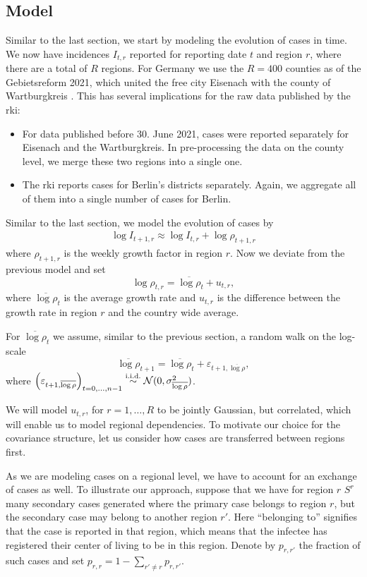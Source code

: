 \subsection{Model}
Similar to the last section, we start by modeling the evolution of cases in time. We now have incidences $I_{t,r}$ reported for reporting date $t$ and region $r$, where there are a total of $R$ regions. For Germany we use the $R=400$ counties as of the Gebietsreform 2021, which united the free city Eisenach with the county of Wartburgkreis \citep{FreistaatThueringen2019Thueringer}. This has several implications for the raw data published by the \gls{rki}:
\begin{itemize}
    \item For data published before 30. June 2021, cases were reported separately for Eisenach and the Wartburgkreis. In pre-processing the data on the county level, we merge these two regions into a single one.
    \item The \gls{rki} reports cases for Berlin's districts separately. Again, we aggregate all of them into a single number of cases for Berlin. 
\end{itemize}

Similar to the last section, we model the evolution of cases by 
\begin{align}
    \label{eq:log-growth-regional-model}
    \log I_{t + 1, r} \approx \log I_{t, r} + \log \rho_{t + 1, r}
\end{align}
where $\rho_{t+1, r}$ is the weekly growth factor in region $r$. Now we deviate from the previous model and set
$$
    \log \rho_{t, r} = \overline{\log \rho}_{t} + u_{t, r},
$$
where $\overline{\log\rho}_{t}$ is the average growth rate and $u_{t,r}$ is the difference between the growth rate in region $r$ and the country wide average. 

For $\overline{\log \rho}_{t}$ we assume, similar to the previous section, a random walk on the log-scale
$$
    \overline{\log\rho}_{t +1} = \overline{\log\rho}_{t} + \varepsilon_{t+1, \overline{\log \rho}},
$$
where $\left(\varepsilon_{t + 1, \overline{\log\rho}}\right)_{t =0, \dots, n-1} \stackrel{\text{i.i.d.}}{\sim} \mathcal N(0, \sigma^{2}_{\overline{\log\rho}})$.

We will model $u_{t,r}$, for $r = 1, \dots, R$ to be jointly Gaussian, but correlated, which will enable us to model regional dependencies. To motivate our choice for the covariance structure, let us consider how cases are transferred between regions first.

As we are modeling cases on a regional level, we have to account for an exchange of cases as well. To illustrate our approach, suppose that we have for region $r$ $S^{r}$ many secondary cases generated where the primary case belongs to region $r$, but the secondary case may belong to another region $r'$. Here ``{}belonging to''{} signifies that the case is reported in that region, which means that the infectee has registered their center of living to be in this region. Denote by $p_{r,r'}$ the fraction of such cases and set $p_{r,r} = 1 - \sum_{r' \neq r} p_{r,r'}$. 

